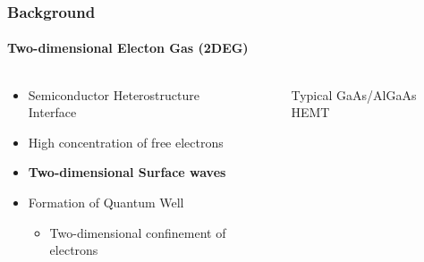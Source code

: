 \documentclass[mathserif,18pt,xcolor=table]{beamer}
\begin{document}
\begin{frame}
  \frametitle{Background}
  \framesubtitle{Two-dimensional Electon Gas (2DEG)}

  \begin{columns} %
    \begin{column}{.5\textwidth}
      \begin{minipage}[T][.1\textheight][c]{\linewidth}
        \begin{itemize}
          \item Semiconductor Heterostructure Interface
          \item High concentration of free electrons
          \item \textbf{Two-dimensional Surface waves}
          \item Formation of Quantum Well
          \begin{itemize}
            \item[]{Two-dimensional confinement of electrons}
          \end{itemize}
        \end{itemize}
      \end{minipage}
    \end{column}
    \begin{column}{.5\textwidth}
      \begin{figure}
        \def\svgwidth{\linewidth}
        
        \caption{Typical GaAs/AlGaAs HEMT}
      \end{figure}
      \end{column}%
    \end{columns}
  \end{frame}
\end{document}
